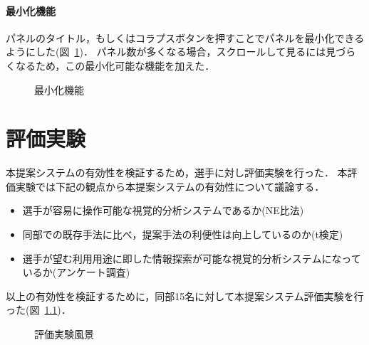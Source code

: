 \documentclass[sotsuron]{kuee}
\begin{document}
			\subsubsection{最小化機能}
				パネルのタイトル，もしくはコラプスボタンを押すことでパネルを最小化できるようにした(図~\ref{fig:collapse})．
				パネル数が多くなる場合，スクロールして見るには見づらくなるため，この最小化可能な機能を加えた．
					\begin{figure}
						\begin{center}
						\end{center}
						\caption{最小化機能}
				  		\label{fig:collapse}
					\end{figure}

\chapter{評価実験}
	本提案システムの有効性を検証するため，選手に対し評価実験を行った．
	本評価実験では下記の観点から本提案システムの有効性について議論する．
	\begin{itemize}
		\item 選手が容易に操作可能な視覚的分析システムであるか(NE比法)
		\item 同部での既存手法に比べ，提案手法の利便性は向上しているのか(t検定)
		\item 選手が望む利用用途に即した情報探索が可能な視覚的分析システムになっているか(アンケート調査)
	\end{itemize}
	以上の有効性を検証するために，同部15名に対して本提案システム評価実験を行った(図~\ref{fig:experi})．
		\begin{figure}
			\begin{center}
			\end{center}
			\caption{評価実験風景}
	  		\label{fig:experi}
		\end{figure}
\end{document}
